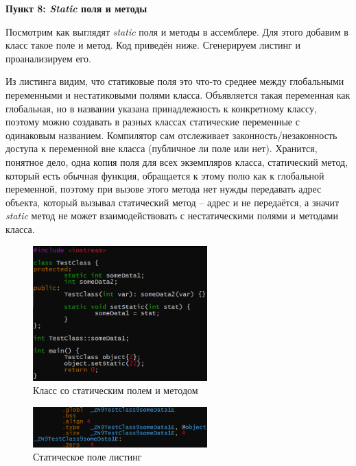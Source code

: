 \documentclass[a4paper,12pt]{article}
\begin{document}
\textbf{Пункт 8: \textit{Static} поля и методы}

Посмотрим как выглядят \textit{static} поля и методы в ассемблере. Для этого добавим в класс такое поле и метод. Код приведён ниже. Сгенерируем листинг и проанализируем его.

Из листинга видим, что статиковые поля это что-то среднее между глобальными переменными и нестатиковыми полями класса. Объявляется такая переменная как глобальная, но в названии указана принадлежность к конкретному классу, поэтому можно создавать в разных классах статические переменные с одинаковым названием. Компилятор сам отслеживает законность/незаконность доступа к переменной вне класса (публичное ли поле или нет). Хранится, понятное дело, одна копия поля для всех экземпляров класса, статический метод, который есть обычная функция, обращается к этому полю как к глобальной переменной, поэтому при вызове этого метода нет нужды передавать адрес объекта, который вызывал статический метод -- адрес и не передаётся, а значит \textit{static} метод не может взаимодействовать с нестатическими полями и методами класса.

\begin{figure}[H]\label{fig: Статические поля и методы код}
    \centering
    \includegraphics[width = 0.6\textwidth]{Статик переменные код.png}
    \caption{Класс со статическим полем и методом}
\end{figure}

\begin{figure}[H]\label{fig: Статическое поля листинг}
    \centering
    \includegraphics[width = 0.6\textwidth]{Статическое поле листинг.png}
    \caption{Статическое поле листинг}
\end{figure}
\end{document}
